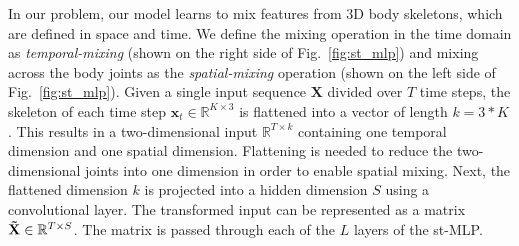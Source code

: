 \documentclass[letterpaper, 10 pt, conference]{ieeeconf}
\begin{document}
In our problem, our model learns to mix features from 3D body skeletons, which are defined in space and time. We define the mixing operation in the time domain as \textit{temporal-mixing} (shown on the right side of Fig.~\ref{fig:st_mlp}) and mixing across the body joints as the \textit{spatial-mixing} operation (shown on the left side of Fig.~\ref{fig:st_mlp}). Given a single input sequence $\mathbf{X}$ divided over $T$ time steps, the skeleton of each time step $\mathbf{x}_{t}\in\mathbb{R}^{K\times 3}$ is flattened into a vector of length $k = 3 * K$. This results in a two-dimensional input $\mathbb{R}^{T\times k}$ containing one temporal dimension and one spatial dimension. Flattening is needed to reduce the two-dimensional joints into one dimension in order to enable spatial mixing. Next, the flattened dimension $k$ is projected into a hidden dimension $S$ using a convolutional layer. The transformed input can be represented as a matrix $\mathbf{\Tilde{X}} \in \mathbb{R}^{T\times S}$. The matrix is passed through each of the $L$ layers of the st-MLP.
\end{document}
